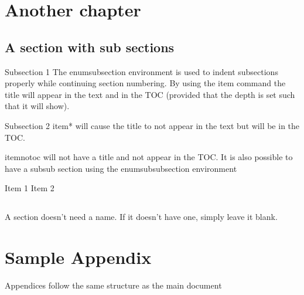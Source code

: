 \documentclass[bylaws,final,10pt,withoptional,withpreface]{bylaws}
\begin{document}
\chapter{Another chapter}


\section{A section with sub sections}
\begin{enumsubsection}
\item{Subsection 1} The enumsubsection environment is used to indent subsections properly while continuing section numbering. By using the item command the title will appear in the text and in the TOC (provided that the depth is set such that it will show).
\item*{Subsection 2}
 item* will cause the title to not appear in the text but will be in the TOC.

\itemnotoc
 itemnotoc will not have a title and not appear in the TOC. It is also possible to have a subsub section using the enumsubsubsection environment
\begin{enumsubsubsection}

\itemnotoc Item 1
\itemnotoc Item 2


 \end{enumsubsubsection}
\end{enumsubsection}

\section{}
A section doesn't need a name. If it doesn't have one, simply leave it blank.

\appendix
\chapter{Sample Appendix}
Appendices follow the same structure as the main document
\end{document}
